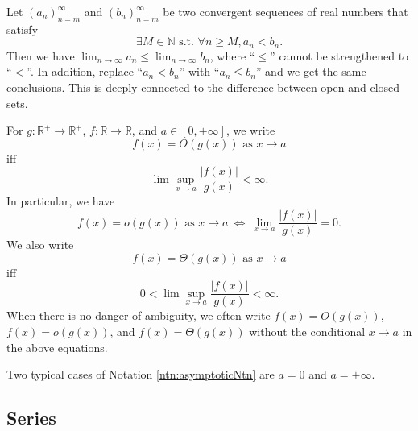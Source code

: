 \begin{rem}
  Let $(a_n)_{n=m}^{\infty}$ and $(b_n)_{n=m}^{\infty}$
  be two convergent sequences of real numbers
  that satisfy
  \begin{displaymath}
    \exists M\in \mathbb{N} \text{ s.t. }
    \forall n\ge M, a_n< b_n.
  \end{displaymath}
  Then we have
  $\lim_{n\rightarrow \infty} a_n\le \lim_{n\rightarrow  \infty} b_n$, 
  where ``$\le$'' cannot be strengthened to ``$<$''.
  In addition, replace ``$a_n< b_n$''
  with ``$a_n\le b_n$'' and we get the same conclusions.
  This is deeply connected to the difference between
  open and closed sets.
\end{rem}

\begin{ntn}
  \label{ntn:asymptoticNtn}
  For $g:\mathbb{R}^+\rightarrow\mathbb{R}^+$, 
  $f:\mathbb{R} \rightarrow\mathbb{R}$, 
  and $a\in [0,+\infty]$, 
  we write
  \begin{displaymath}
    f(x) = O(g(x)) \text{ as } x\to a %
  \end{displaymath}
  iff %
  \begin{displaymath}
    \lim\sup_{x\rightarrow a} \frac{|f(x)|}{g(x)} < \infty.
  \end{displaymath}
  In particular, we have
  \begin{displaymath}
    f(x) = o(g(x)) \text{ as } x\to a
    \ \Leftrightarrow\
    \lim_{x\rightarrow a} \frac{|f(x)|}{g(x)} = 0.
  \end{displaymath}
  We also write
  \begin{displaymath}
    f(x)=\Theta(g(x)) \text{ as } x\to a %
  \end{displaymath}
  iff
  \begin{displaymath}
    0< \lim\sup_{x\rightarrow a} \frac{|f(x)|}{g(x)} < \infty.
  \end{displaymath}
  When there is no danger of ambiguity,
  we often write $f(x)=O(g(x))$,
  $f(x)=o(g(x))$, and $f(x)=\Theta(g(x))$
  without the conditional $x \rightarrow a$
  in the above equations.
\end{ntn}

\begin{rem}
  Two typical cases of Notation \ref{ntn:asymptoticNtn}
  are $a=0$ and $a=+\infty$.
\end{rem}

\subsection{Series}
\label{sec:series}

